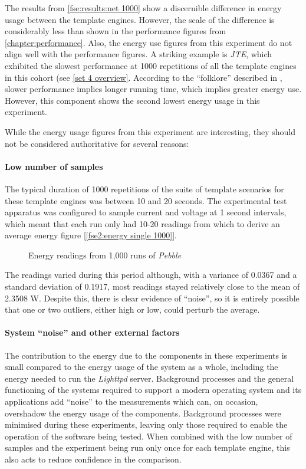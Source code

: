 The results from \autoref{fse:results:net 1000} show a discernible difference in energy usage between the \gls{template engine}s. However, the scale of the difference is considerably less than shown in the performance figures from \autoref{chapter:performance}. Also, the energy use figures from this experiment do not align well with the performance figures. A striking example is \emph{JTE}, which exhibited the slowest performance at 1000 repetitions of all the \gls{template engine}s in this cohort (see \autoref{set 4 overview}. According to the \enquote{folklore} described in \citep{Yuki2013}, slower performance implies longer running time, which implies greater energy use. However, this component shows the second lowest energy usage in this experiment.

While the energy usage figures from this experiment are interesting, they should not be considered authoritative for several reasons:

\paragraph{Low number of samples}
The typical duration of 1000 repetitions of the suite of template scenarios for these \gls{template engine}s was between 10 and 20 seconds. The experimental test apparatus was configured to sample current and voltage at 1 second intervals, which meant that each run only had 10-20 readings from which to derive an average energy figure [\autoref{fse2:energy single 1000}]. 

\begin{figure}[htbp]
  \centering
  
  \caption{Energy readings from 1,000 runs of \emph{Pebble}}
  \label{fse2:energy single 1000}
\end{figure}

\label{A204}
The readings varied during this period although, with a variance of 0.0367 and a standard deviation of 0.1917, most readings stayed relatively close to the mean of 2.3508 W. Despite this, there is clear evidence of \enquote{noise}, so it is entirely possible that one or two outliers, either high or low, could perturb the average.

\paragraph{System \enquote{noise} and other external factors}
\label{A206}
The contribution to the energy due to the components in these experiments is small compared to the energy usage of the system as a whole, including the energy needed to run the \emph{Lighttpd} server. Background processes and the general functioning of the systems required to support a modern operating system and its applications add \enquote{noise} to the measurements which can, on occasion, overshadow the energy usage of the components. Background processes were minimised during these experiments, leaving only those required to enable the operation of the software being tested. When combined with the low number of samples and the experiment being run only once for each \gls{template engine}, this also acts to reduce confidence in the comparison.

